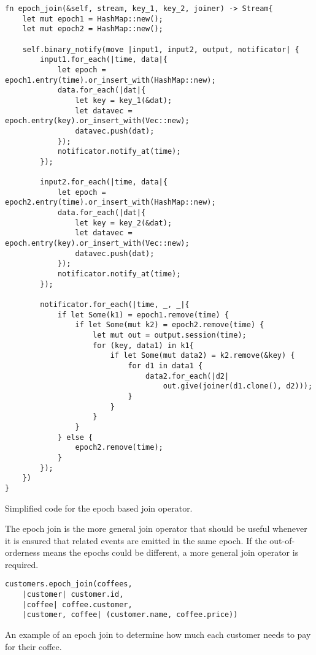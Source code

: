 \begin{listing}[H]
\begin{verbatim}
fn epoch_join(&self, stream, key_1, key_2, joiner) -> Stream{
    let mut epoch1 = HashMap::new();
    let mut epoch2 = HashMap::new();
    
    self.binary_notify(move |input1, input2, output, notificator| {
        input1.for_each(|time, data|{
            let epoch = epoch1.entry(time).or_insert_with(HashMap::new);
            data.for_each(|dat|{
                let key = key_1(&dat);
                let datavec = epoch.entry(key).or_insert_with(Vec::new);
                datavec.push(dat);
            });
            notificator.notify_at(time);
        });
        
        input2.for_each(|time, data|{
            let epoch = epoch2.entry(time).or_insert_with(HashMap::new);
            data.for_each(|dat|{
                let key = key_2(&dat);
                let datavec = epoch.entry(key).or_insert_with(Vec::new);
                datavec.push(dat);
            });
            notificator.notify_at(time);
        });
        
        notificator.for_each(|time, _, _|{
            if let Some(k1) = epoch1.remove(time) {
                if let Some(mut k2) = epoch2.remove(time) {
                    let mut out = output.session(time);
                    for (key, data1) in k1{
                        if let Some(mut data2) = k2.remove(&key) {
                            for d1 in data1 {
                                data2.for_each(|d2|
                                    out.give(joiner(d1.clone(), d2)));
                            }
                        }
                    }
                }
            } else {
                epoch2.remove(time);
            }
        });
    })
}
\end{verbatim}
  \caption{Simplified code for the epoch based join operator.}
  \label{lst:epoch-join}
\end{listing}

The epoch join is the more general join operator that should be useful whenever it is ensured that related events are emitted in the same epoch. If the out-of-orderness means the epochs could be different, a more general join operator is required.

\begin{listing}[H]
\begin{verbatim}
customers.epoch_join(coffees,
    |customer| customer.id, 
    |coffee| coffee.customer, 
    |customer, coffee| (customer.name, coffee.price))
\end{verbatim}
\caption{An example of an epoch join to determine how much each customer needs to pay for their coffee.}
\label{lst:epoch-join-example}
\end{listing}

